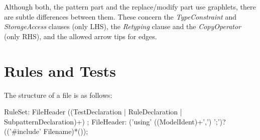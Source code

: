 \begin{figure}[htbp]
\end{figure}

\begin{note}
	Although both, the pattern part and the replace/modify part use graphlets, there are subtle differences between them. 
	These concern the \emph{TypeConstraint} and \emph{StorageAccess} clauses (only LHS), the \emph{Retyping} clause and the \emph{CopyOperator} (only RHS), and the allowed arrow tips for edges.
\end{note}


\section{Rules and Tests}
\label{ruledecls}
The structure of a  file is as follows:
\begin{rail}
  RuleSet: FileHeader ((TestDeclaration | RuleDeclaration | SubpatternDeclaration)+) ;
  FileHeader: ('using' ((ModelIdent)+',') ';')? (('\#include' Filename)*());
\end{rail}

